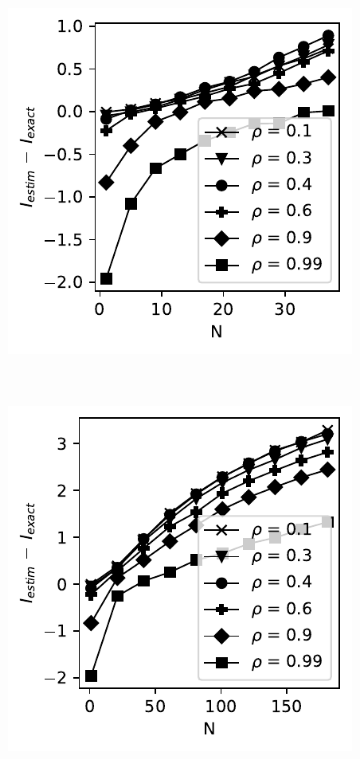 \documentclass[../Thesis.tex]{subfiles}
\begin{document}
\begin{figure}[H]
    \centering
    \begin{subfigure}[t]{0.4\textwidth}
        \centering
        \includegraphics[width=\linewidth]{figures/ND examples/MI calc/gaussian example original all - error.pdf}
        \caption{}
    \end{subfigure}%
    ~
    \begin{subfigure}[t]{0.4\textwidth}
        \centering
        \includegraphics[width=\linewidth]{figures/ND examples/MI calc/gaussian example original all extended - error.pdf}

\end{subfigure}
\end{figure}
\end{document}

